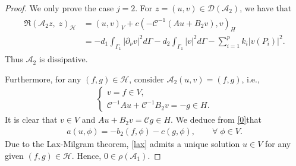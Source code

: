 \documentclass[10pt,a4paper]{amsart}
\begin{document}
\begin{proof} We only prove the case $j=2$.
	For $z=(u,v)\in \mathcal{D}(\mathcal{A}_2)$, we have that
	\begin{align}\label{haosan}
		\begin{split}
			\Re(\mathcal{A}_2 z,\; z)_{\mathcal{H} } &= (u,v)_{V} + c (-\mathcal C^{-1}(A u + B_2 v), v)_{H} \\
			& = - d_1\int_{\Gamma_1}|\partial_{\nu} v|^2 d\Gamma - d_2 \int_{\Gamma_1}|v|^2 d\Gamma - \sum_{i=1}^p k_i  |v(P_i)|^2.
		\end{split}
	\end{align}
	Thus $\mathcal{A}_2$ is dissipative.
	
	Furthermore, for any $(f,g)\in \mathcal H$, consider  $\mathcal A_2(u,v)=(f,g)$, i.e.,
	\begin{align}\label{0}
		\begin{cases}
			v = f \in V,\\
			\mathcal C ^{-1}A u + \mathcal C^{-1}B_2 v = -g\in H.
		\end{cases}
	\end{align}
	It is clear that $v\in V$ and $A u + B_2 v = \mathcal C g\in H$.
	We deduce from \eqref{0}that
	\begin{align}\label{lax}
		a(u,\phi) = - b_2(f,\phi) - c(g,\phi),\qquad\forall\;\phi\in V.
	\end{align}
	Due to the Lax-Milgram theorem, \eqref{lax} admits a unique solution $u\in V$ for any
	given $(f,g)\in\mathcal H$.
	Hence, $0\in\rho(\mathcal{A}_1)$.
\end{proof}
\end{document}
